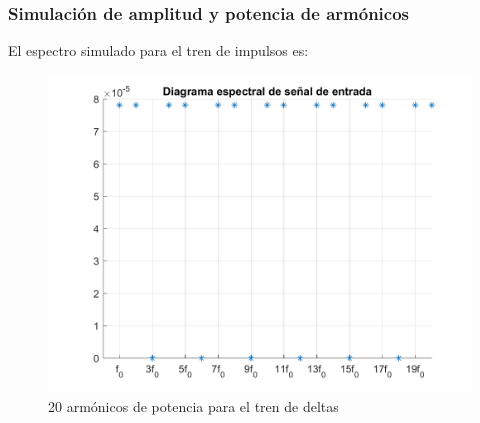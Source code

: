 \documentclass[../../labo_tp5_main.tex]{subfiles}
\begin{document}
\subsubsection{Simulación de amplitud y potencia de armónicos}
El espectro simulado para el tren de impulsos es:\par

\begin{figure}[H]	
	\centering
	\includegraphics[scale=0.4]{imagenes/espectro_tren_pulsos.png}
	\caption{20 armónicos de potencia para el tren de deltas}
	\label{fig:ej1_espectro_tren_pulsos}
\end{figure}
\end{document}
